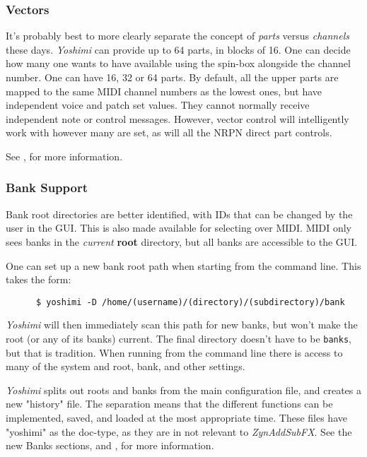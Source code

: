 \documentclass[
 11pt,
 twoside,
 a4paper,
 final                                 %
]{article}
\begin{document}
\subsubsection{Vectors}
\label{subsubsec:new_features_vectors}

   It's probably best to more clearly separate the concept of
   \textsl{parts} versus \textsl{channels} these days. 
   \textsl{Yoshimi} can provide up to 64 parts, in blocks of 16. One can
   decide how many one wants to have available using the spin-box alongside
   the channel number.  One can have 16, 32 or 64 parts.  By default, all the
   upper parts are mapped to the same MIDI channel numbers as the lowest ones,
   but have independent voice and patch set values. They cannot normally
   receive independent note or control messages. However, vector control will
   intelligently work with however many are set, as will all the NRPN direct
   part controls.

   See , for more information.

\subsubsection{Bank Support}
\label{subsubsec:new_features_bank_support}

   Bank root directories are better identified, with IDs that can be changed by
   the user in the GUI. This is also made available for selecting over MIDI.
   MIDI only sees banks in the \textsl{current}
   \textbf{root} directory, but all banks are accessible to the GUI.

   One can set up a new bank root path when starting from the
   command line. This takes the form:

   \begin{verbatim}
      $ yoshimi -D /home/(username)/(directory)/(subdirectory)/bank
   \end{verbatim}

   \textsl{Yoshimi} will then immediately scan this path for new banks, but
   won't make the root (or any of its banks) current. The final directory
   doesn't have to be \texttt{banks}, but that is tradition.
   When running from the command line there is access to many
   of the system and root, bank, and other settings.

	\textsl{Yoshimi} splits out roots and banks from the main configuration
	file, and creates a new "history" file. The separation means that the
	different functions can be implemented, saved, and loaded at the most
   appropriate time. These files have "yoshimi" as the doc-type, as they are in
   not relevant to \textsl{ZynAddSubFX}.
   See the new Banks sections,
   and
   ,
   for more information.
\end{document}
